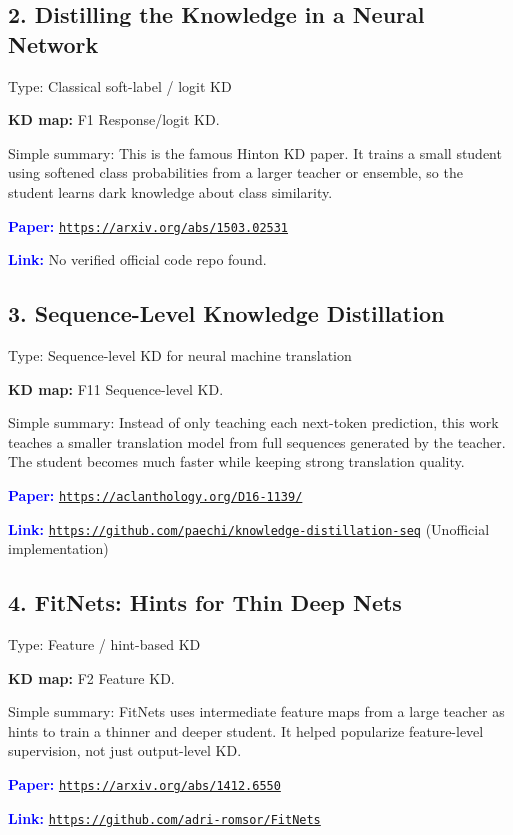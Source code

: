 \documentclass[10pt]{article}
\begin{document}
\subsection*{2. Distilling the Knowledge in a Neural Network}
Type: Classical soft-label / logit KD\par
\textbf{KD map:} F1 Response/logit KD.\par
Simple summary: This is the famous Hinton KD paper. It trains a small student using softened class probabilities from a larger teacher or ensemble, so the student learns dark knowledge about class similarity.\par
\textcolor{blue}{\textbf{Paper:}} \href{https://arxiv.org/abs/1503.02531}{\nolinkurl{https://arxiv.org/abs/1503.02531}}\par
\textcolor{blue}{\textbf{Link:}} No verified official code repo found.\par

\subsection*{3. Sequence-Level Knowledge Distillation}
Type: Sequence-level KD for neural machine translation\par
\textbf{KD map:} F11 Sequence-level KD.\par
Simple summary: Instead of only teaching each next-token prediction, this work teaches a smaller translation model from full sequences generated by the teacher. The student becomes much faster while keeping strong translation quality.\par
\textcolor{blue}{\textbf{Paper:}} \href{https://aclanthology.org/D16-1139/}{\nolinkurl{https://aclanthology.org/D16-1139/}}\par
\textcolor{blue}{\textbf{Link:}} \href{https://github.com/paechi/knowledge-distillation-seq}{\nolinkurl{https://github.com/paechi/knowledge-distillation-seq}} (Unofficial implementation)\par

\subsection*{4. FitNets: Hints for Thin Deep Nets}
Type: Feature / hint-based KD\par
\textbf{KD map:} F2 Feature KD.\par
Simple summary: FitNets uses intermediate feature maps from a large teacher as hints to train a thinner and deeper student. It helped popularize feature-level supervision, not just output-level KD.\par
\textcolor{blue}{\textbf{Paper:}} \href{https://arxiv.org/abs/1412.6550}{\nolinkurl{https://arxiv.org/abs/1412.6550}}\par
\textcolor{blue}{\textbf{Link:}} \href{https://github.com/adri-romsor/FitNets}{\nolinkurl{https://github.com/adri-romsor/FitNets}}\par
\end{document}

